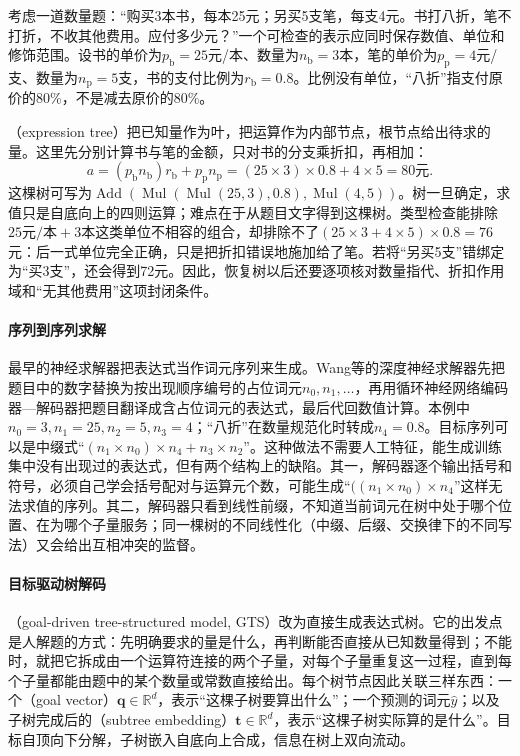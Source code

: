 考虑一道数量题：“购买3本书，每本25元；另买5支笔，每支4元。书打八折，笔不打折，不收其他费用。应付多少元？”一个可检查的表示应同时保存数值、单位和修饰范围。设书的单价为$p_{\mathrm{b}}=25$元/本、数量为$n_{\mathrm{b}}=3$本，笔的单价为$p_{\mathrm{p}}=4$元/支、数量为$n_{\mathrm{p}}=5$支，书的支付比例为$r_{\mathrm{b}}=0.8$。比例没有单位，“八折”指支付原价的80\%，不是减去原价的80\%。

（expression tree）把已知量作为叶，把运算作为内部节点，根节点给出待求的量。这里先分别计算书与笔的金额，只对书的分支乘折扣，再相加：
\begin{equation}
  a=(p_{\mathrm{b}}n_{\mathrm{b}})r_{\mathrm{b}}
      +p_{\mathrm{p}}n_{\mathrm{p}}
    =(25\times3)\times0.8+4\times5=80\text{元}.
  \label{eq:nlp-execution-price}
\end{equation}
这棵树可写为$\operatorname{Add}(\operatorname{Mul}(\operatorname{Mul}(25,3),0.8),\operatorname{Mul}(4,5))$。树一旦确定，求值只是自底向上的四则运算；难点在于从题目文字得到这棵树。类型检查能排除$25\text{元/本}+3\text{本}$这类单位不相容的组合，却排除不了$(25\times3+4\times5)\times0.8=76$元：后一式单位完全正确，只是把折扣错误地施加给了笔。若将“另买5支”错绑定为“买3支”，还会得到72元。因此，恢复树以后还要逐项核对数量指代、折扣作用域和“无其他费用”这项封闭条件。

\paragraph{序列到序列求解}
最早的神经求解器把表达式当作词元序列来生成。Wang等的深度神经求解器先把题目中的数字替换为按出现顺序编号的占位词元$n_0,n_1,\ldots$，再用循环神经网络编码器—解码器把题目翻译成含占位词元的表达式，最后代回数值计算。本例中$n_0=3,n_1=25,n_2=5,n_3=4$；“八折”在数量规范化时转成$n_4=0.8$。目标序列可以是中缀式“$(n_1\times n_0)\times n_4+n_3\times n_2$”。这种做法不需要人工特征，能生成训练集中没有出现过的表达式，但有两个结构上的缺陷。其一，解码器逐个输出括号和符号，必须自己学会括号配对与运算元个数，可能生成“$((n_1\times n_0)\times n_4$”这样无法求值的序列。其二，解码器只看到线性前缀，不知道当前词元在树中处于哪个位置、在为哪个子量服务；同一棵树的不同线性化（中缀、后缀、交换律下的不同写法）又会给出互相冲突的监督。

\paragraph{目标驱动树解码}
（goal-driven tree-structured model, GTS）改为直接生成表达式树。它的出发点是人解题的方式：先明确要求的量是什么，再判断能否直接从已知数量得到；不能时，就把它拆成由一个运算符连接的两个子量，对每个子量重复这一过程，直到每个子量都能由题中的某个数量或常数直接给出。每个树节点因此关联三样东西：一个（goal vector）$\bm{q}\in\mathbb{R}^{d}$，表示“这棵子树要算出什么”；一个预测的词元$\hat y$；以及子树完成后的（subtree embedding）$\bm{t}\in\mathbb{R}^{d}$，表示“这棵子树实际算的是什么”。目标自顶向下分解，子树嵌入自底向上合成，信息在树上双向流动。

